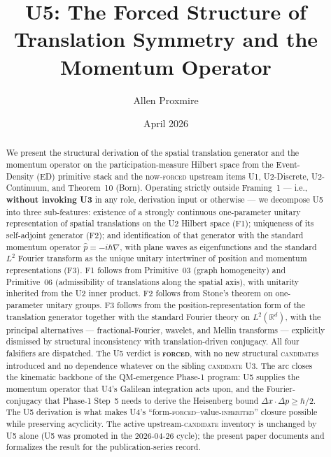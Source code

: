 \documentclass[11pt,a4paper]{article}
\title{U5: The Forced Structure of Translation Symmetry and the Momentum Operator}
\author{Allen Proxmire}
\date{April 2026}
\begin{document}
\maketitle

\begin{abstract}
We present the structural derivation of the spatial translation generator and the momentum operator on the participation-measure Hilbert space from the Event-Density (ED) primitive stack and the now-\textsc{forced} upstream items U1, U2-Discrete, U2-Continuum, and Theorem~10 (Born). Operating strictly outside Framing~1 --- i.e., \textbf{without invoking U3} in any role, derivation input or otherwise --- we decompose U5 into three sub-features: existence of a strongly continuous one-parameter unitary representation of spatial translations on the U2 Hilbert space (F1); uniqueness of its self-adjoint generator (F2); and identification of that generator with the standard momentum operator $\hat{p} = -i\hbar\nabla$, with plane waves as eigenfunctions and the standard $L^2$ Fourier transform as the unique unitary intertwiner of position and momentum representations (F3). F1 follows from Primitive~03 (graph homogeneity) and Primitive~06 (admissibility of translations along the spatial axis), with unitarity inherited from the U2 inner product. F2 follows from Stone's theorem on one-parameter unitary groups. F3 follows from the position-representation form of the translation generator together with the standard Fourier theory on $L^2(\mathbb{R}^d)$, with the principal alternatives --- fractional-Fourier, wavelet, and Mellin transforms --- explicitly dismissed by structural inconsistency with translation-driven conjugacy. All four falsifiers are dispatched. The U5 verdict is \textbf{\textsc{forced}}, with no new structural \textsc{candidate}s introduced and no dependence whatever on the sibling \textsc{candidate} U3. The arc closes the kinematic backbone of the QM-emergence Phase-1 program: U5 supplies the momentum operator that U4's Galilean integration acts upon, and the Fourier-conjugacy that Phase-1 Step~5 needs to derive the Heisenberg bound $\Delta x \cdot \Delta p \geq \hbar/2$. The U5 derivation is what makes U4's ``form-\textsc{forced}--value-\textsc{inherited}'' closure possible while preserving acyclicity. The active upstream-\textsc{candidate} inventory is unchanged by U5 alone (U5 was promoted in the 2026-04-26 cycle); the present paper documents and formalizes the result for the publication-series record.
\end{abstract}
\end{document}
